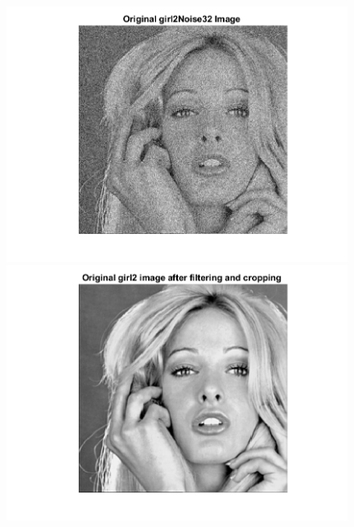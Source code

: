 \documentclass[11pt]{article} %
\begin{document}
\begin{figure}
 \centering
	\includegraphics{2cc.png}
	\includegraphics{2cd.png}
\end{figure}
\end{document}
